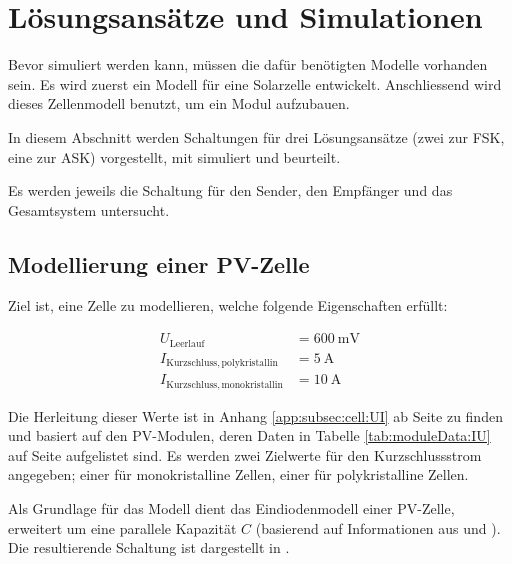 \chapter{L\"osungsans\"atze und Simulationen}
\label{chap:simu}

Bevor  simuliert  werden  kann,  m\"ussen  die  daf\"ur  ben\"otigten  Modelle
vorhanden sein. Es  wird zuerst ein  Modell f\"ur eine  Solarzelle entwickelt.
Anschliessend wird dieses Zellenmodell benutzt, um ein Modul aufzubauen.

In  diesem Abschnitt  werden Schaltungen  f\"ur drei  L\"osungsans\"atze (zwei
zur  FSK, eine  zur  ASK)  vorgestellt, mit   simuliert  und
beurteilt.

Es werden  jeweils die  Schaltung f\"ur  den Sender,  den Empf\"anger  und das
Gesamtsystem untersucht.


\section{Modellierung einer PV-Zelle}
\label{sec:simu:model:cell}


Ziel ist, eine Zelle zu modellieren, welche folgende Eigenschaften erf\"ullt:

\begin{align}
    U_{\mathrm{Leerlauf}}                    &= \SI{600}{\milli\volt} \\
    I_{\mathrm{Kurzschluss, polykristallin}} &=  \SI{5}{\ampere}      \\
    I_{\mathrm{Kurzschluss, monokristallin}} &= \SI{10}{\ampere}
\end{align}

Die Herleitung  dieser Werte ist  in Anhang \ref{app:subsec:cell:UI}  ab Seite
\pageref{app:subsec:cell:UI} zu  finden und basiert auf  den PV-Modulen, deren
Daten in Tabelle \ref{tab:moduleData:IU} auf Seite \pageref{tab:moduleData:IU}
aufgelistet  sind.   Es  werden  zwei  Zielwerte  f\"ur  den  Kurzschlussstrom
angegeben;  einer f\"ur  monokristalline Zellen,  einer f\"ur  polykristalline
Zellen.

Als  Grundlage f\"ur  das  Modell dient  das  Eindiodenmodell einer  PV-Zelle,
erweitert  um  eine parallele  Kapazit\"at  $C$  (basierend auf  Informationen
aus \cite{ref:solar:scofield} und \cite{ref:solar:friesen}). Die resultierende
Schaltung ist dargestellt in .

